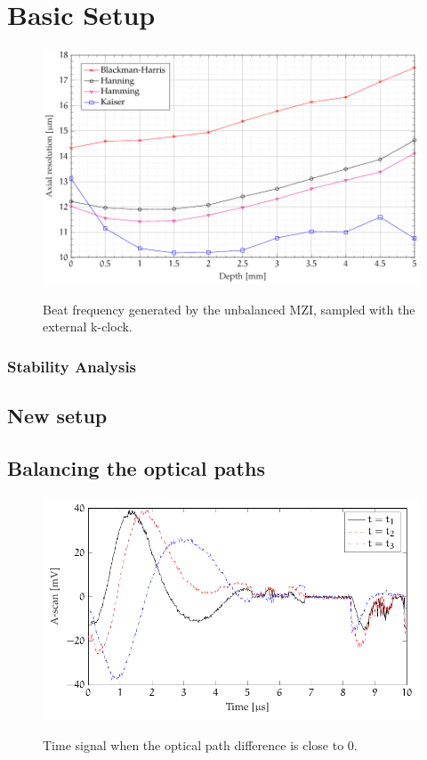 \section{Basic Setup}




\begin{figure}[hbt]
{\myfloatalign
\includegraphics[width=\linewidth]{gfx/ch3/risoluzione-profondita}}
\caption{Beat frequency generated by the unbalanced \ac{MZI}, sampled with the external k-clock.}\label{fig:mzi-external}
\end{figure}


\subsubsection{Stability Analysis}


\subsection{New setup}

\subsection{Balancing the optical paths}

\begin{figure}[hbt]
{\myfloatalign
\includegraphics[width=\linewidth]{gfx/tikz/balancing/balanced}}
\caption{Time signal when the optical path difference is close to 0.}\label{fig:signal-balanced}
\end{figure}

